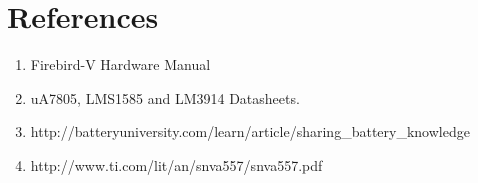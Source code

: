 \documentclass[11pt,a4paper]{article}
\begin{document}
		
			\newpage
			\section{References}
			\begin{enumerate}
				\item Firebird-V Hardware Manual
				\item uA7805, LMS1585 and LM3914 Datasheets. 
				\item http://batteryuniversity.com/learn/article/sharing\_battery\_knowledge
				\item http://www.ti.com/lit/an/snva557/snva557.pdf	
			\end{enumerate}
		
		
\end{document}
